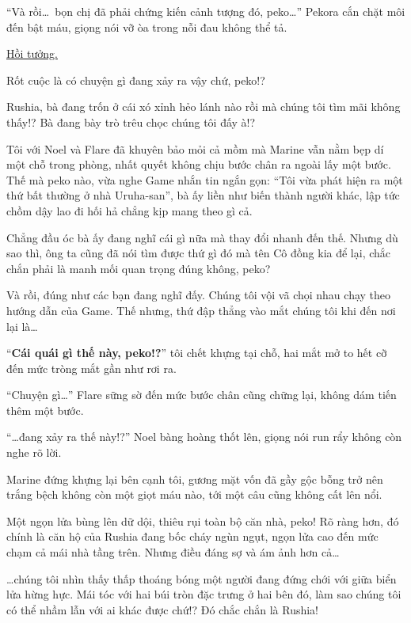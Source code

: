 \documentclass[../main.tex]{subfiles}
\begin{document}
``Và rồi\dots\ bọn chị đã phải chứng kiến cảnh tượng đó, peko\dots'' Pekora cắn chặt môi đến bật máu, giọng nói vỡ òa trong nỗi đau không thể tả.

\begin{center}
    \uline{Hồi tưởng.}\\ 
\end{center}

Rốt cuộc là có chuyện gì đang xảy ra vậy chứ, peko!?

Rushia, bà đang trốn ở cái xó xỉnh hẻo lánh nào rồi mà chúng tôi tìm mãi không thấy!? Bà đang bày trò trêu chọc chúng tôi đấy à!?

Tôi với Noel và Flare đã khuyên bảo mỏi cả mồm mà Marine vẫn nằm bẹp dí một chỗ trong phòng, nhất quyết không chịu bước chân ra ngoài lấy một bước. Thế mà peko nào, vừa nghe Game nhắn tin ngắn gọn: ``Tôi vừa phát hiện ra một thứ bất thường ở nhà Uruha-san'', bà ấy liền như biến thành người khác, lập tức chồm dậy lao đi hối hả chẳng kịp mang theo gì cả.

Chẳng đầu óc bà ấy đang nghĩ cái gì nữa mà thay đổi nhanh đến thế. Nhưng dù sao thì, ông ta cũng đã nói tìm được thứ gì đó mà tên Cô đồng kia để lại, chắc chắn phải là manh mối quan trọng đúng không, peko?

Và rồi, đúng như các bạn đang nghĩ đấy. Chúng tôi vội vã chọi nhau chạy theo hướng dẫn của Game. Thế nhưng, thứ đập thẳng vào mắt chúng tôi khi đến nơi lại là\dots

``\textbf{Cái quái gì thế này, peko!?}'' tôi chết khựng tại chỗ, hai mắt mở to hết cỡ đến mức tròng mắt gần như rơi ra.

``Chuyện gì\dots'' Flare sững sờ đến mức bước chân cũng chững lại, không dám tiến thêm một bước.

``\dots đang xảy ra thế này!?'' Noel bàng hoàng thốt lên, giọng nói run rẩy không còn nghe rõ lời.

Marine đứng khựng lại bên cạnh tôi, gương mặt vốn đã gầy gộc bỗng trở nên trắng bệch không còn một giọt máu nào, tới một câu cũng không cất lên nổi.

Một ngọn lửa bùng lên dữ dội, thiêu rụi toàn bộ căn nhà, peko! Rõ ràng hơn, đó chính là căn hộ của Rushia đang bốc cháy ngùn ngụt, ngọn lửa cao đến mức chạm cả mái nhà tầng trên. Nhưng điều đáng sợ và ám ảnh hơn cả\dots

\dots chúng tôi nhìn thấy thấp thoáng bóng một người đang đứng chới với giữa biển lửa hừng hực. Mái tóc với hai búi tròn đặc trưng ở hai bên đó, làm sao chúng tôi có thể nhầm lẫn với ai khác được chứ!? Đó chắc chắn là Rushia!
\end{document}
